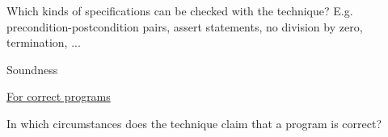 \documentclass[a4paper]{article}
\begin{document}
\begin{minipage}[t]{0.16\linewidth}
\begin{betterlist}
{{\begin{betterlist}
\begin{betterlist}
					\end{betterlist}
				\end{betterlist}
			}}
		\item Which kinds of specifications can be checked with the technique? E.g. precondition-postcondition pairs, assert statements, no division by zero, termination, ...

		\item \alert{Soundness}
		\begin{betterlist}
			\item \underline{For correct programs}
			\begin{betterlist}
				\item In which circumstances does the technique claim that a program is correct?


\end{betterlist}
\end{betterlist}
\end{betterlist}
\end{minipage}
\end{document}
